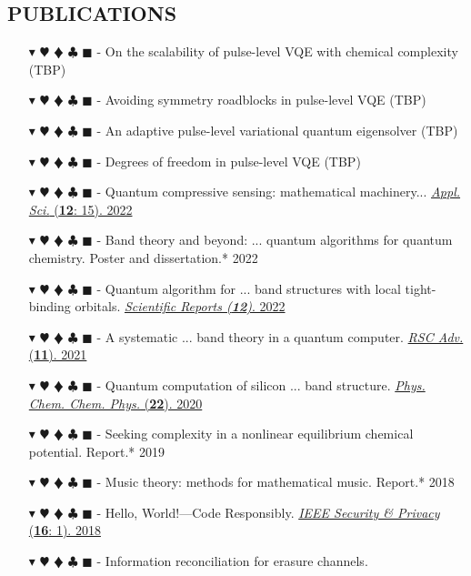 \documentclass[overlapped, 10pt]{res} %
\newcommand{\physics}{$\blacktriangledown$}
\newcommand{\biochem}{$\varheartsuit$}
\newcommand{\shannon}{$\vardiamondsuit$}
\newcommand{\classic}{$\clubsuit$}
\newcommand{\quantum}{$\blacksquare$}
\newcommand{\physicscolor}{\color{YellowOrange}}
\newcommand{\biochemcolor}{\color{Emerald}}
\newcommand{\shannoncolor}{\color{Goldenrod}}
\newcommand{\classiccolor}{\color{Cyan}}
\newcommand{\quantumcolor}{\color{RedOrange}}
\newcommand{\tag}[1]{
    {\IfSubStr{#1}{\physics}{\physicscolor}{\color{White}}\physics}
    {\IfSubStr{#1}{\biochem}{\biochemcolor}{\color{White}}\biochem}
    {\IfSubStr{#1}{\shannon}{\shannoncolor}{\color{White}}\shannon}
    {\IfSubStr{#1}{\classic}{\classiccolor}{\color{White}}\classic}
    {\IfSubStr{#1}{\quantum}{\quantumcolor}{\color{White}}\quantum}
}
\begin{document}
\begin{resume}
\section{PUBLICATIONS}
\begin{itemize} \itemsep -2pt %
\item[\tag{\physics\biochem\shannon\quantum}-] On the scalability of pulse-level VQE with chemical complexity \hfill (TBP)
\item[\tag{\physics\biochem\shannon\quantum}-] Avoiding symmetry roadblocks in pulse-level VQE \hfill (TBP)
\item[\tag{\physics\biochem\shannon\quantum}-] An adaptive pulse-level variational quantum eigensolver \hfill (TBP)
\item[\tag{\physics\biochem\shannon\quantum}-] Degrees of freedom in pulse-level VQE \hfill (TBP)
\item[\tag{\shannon\quantum}-] Quantum compressive sensing: mathematical machinery...
    \hfill \href{https://arxiv.org/abs/2204.13035}{\textit{Appl. Sci.} (\textbf{12}: 15). 2022}
\item[\tag{\physics\biochem\shannon\quantum}-] Band theory and beyond: ... quantum algorithms for quantum chemistry.
    \hfill Poster and dissertation.* 2022
\item[\tag{\physics\quantum}-] Quantum algorithm for ... band structures with local tight-binding orbitals.
    \hfill \href{https://doi.org/10.21203/rs.3.rs-1318951/v1}{\textit{Scientific Reports (\textbf{12})}. 2022}
\item[\tag{\physics\quantum}-] A systematic ... band theory in a quantum computer.
    \hfill \href{https://arxiv.org/abs/2104.03409}{\textit{RSC Adv.} (\textbf{11}). 2021}
\item[\tag{\physics\quantum}-] Quantum computation of silicon ... band structure.
    \hfill \href{https://arxiv.org/abs/2006.03807}{\textit{Phys. Chem. Chem. Phys.} (\textbf{22}). 2020}
\item[\tag{\biochem}-] Seeking complexity in a nonlinear equilibrium chemical potential.
    \hfill Report.* 2019
\item[\tag{}-] Music theory: methods for mathematical music.
    \hfill Report.* 2018
\item[\tag{\classic}-] Hello, World!—Code Responsibly.
    \hfill \href{https://ieeexplore.ieee.org/document/8283486}{\textit{IEEE Security \& Privacy} (\textbf{16}: 1). 2018}
\item[\tag{\shannon\classic}-] Information reconciliation for erasure channels.

\end{itemize}
\end{resume}
\end{document}
